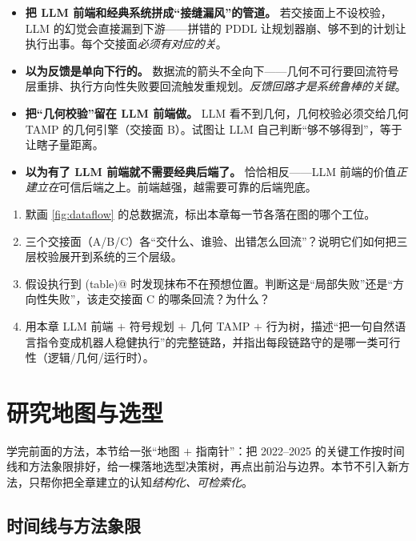 \begin{pitfall}[本节常见陷阱]
\begin{itemize}
  \item \textbf{把 LLM 前端和经典系统拼成“接缝漏风”的管道。} 若交接面上不设校验，LLM 的幻觉会直接漏到下游——拼错的 PDDL 让规划器崩、够不到的计划让执行出事。每个交接面\emph{必须有对应的关}。
  \item \textbf{以为反馈是单向下行的。} 数据流的箭头不全向下——几何不可行要回流符号层重排、执行方向性失败要回流触发重规划。\emph{反馈回路才是系统鲁棒的关键}。
  \item \textbf{把“几何校验”留在 LLM 前端做。} LLM 看不到几何，几何校验必须交给几何 TAMP 的几何引擎（交接面 B）。试图让 LLM 自己判断“够不够得到”，等于让瞎子量距离。
  \item \textbf{以为有了 LLM 前端就不需要经典后端了。} 恰恰相反——LLM 前端的价值\emph{正建立在}可信后端之上。前端越强，越需要可靠的后端兜底。
\end{itemize}
\end{pitfall}

\begin{exercise}
\begin{enumerate}
  \item 默画 \cref{fig:dataflow} 的总数据流，标出本章每一节各落在图的哪个工位。
  \item 三个交接面（A/B/C）各“交什么、谁验、出错怎么回流”？说明它们如何把三层校验展开到系统的三个层级。
  \item 假设执行到 \verb@wipe(table)@ 时发现抹布不在预想位置。判断这是“局部失败”还是“方向性失败”，该走交接面 C 的哪条回流？为什么？
  \item 用本章 LLM 前端 $+$ 符号规划 $+$ 几何 TAMP $+$ 行为树，描述“把一句自然语言指令变成机器人稳健执行”的完整链路，并指出每段链路守的是哪一类可行性（逻辑/几何/运行时）。
\end{enumerate}
\end{exercise}

\section{研究地图与选型}
\label{sec:llm-map}

学完前面的方法，本节给一张“地图 $+$ 指南针”：把 2022--2025 的关键工作按时间线和方法象限排好，给一棵落地选型决策树，再点出前沿与边界。本节不引入新方法，只帮你把全章建立的认知\emph{结构化、可检索化}。

\subsection{时间线与方法象限}
\label{sec:map-quadrant}

